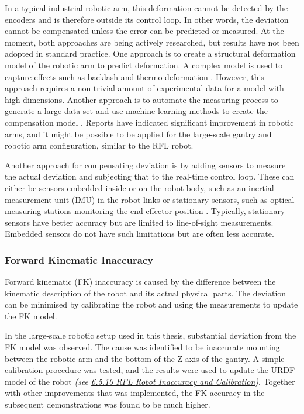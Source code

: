 In a typical industrial robotic arm, this deformation cannot be detected by the encoders and is therefore outside its control loop. In other words, the deviation cannot be compensated unless the error can be predicted or measured. At the moment, both approaches are being actively researched, but results have not been adopted in standard practice. One approach is to create a structural deformation model of the robotic arm to predict deformation. A complex model is used to capture effects such as backlash and thermo deformation \parencite{wuReviewIndustrialRobot2022}. However, this approach requires a non-trivial amount of experimental data for a model with high dimensions. Another approach is to automate the measuring process to generate a large data set and use machine learning methods to create the compensation model \parencite{yeHighaccuracyPredictionCompensation2022}. Reports have indicated significant improvement in robotic arms, and it might be possible to be applied for the large-scale gantry and robotic arm configuration, similar to the RFL robot.

Another approach for compensating deviation is by adding sensors to measure the actual deviation and subjecting that to the real-time control loop. These can either be sensors embedded inside or on the robot body, such as an inertial measurement unit (IMU) in the robot links \parencite{judHEAPAutonomousWalking2021} or stationary sensors, such as optical measuring stations monitoring the end effector position \parencite{stadelmannEndEffectorPoseCorrection2019}. Typically, stationary sensors have better accuracy but are limited to line-of-sight measurements. Embedded sensors do not have such limitations but are often less accurate. 

\subsubsection{Forward Kinematic Inaccuracy}

Forward kinematic (FK) inaccuracy is caused by the difference between the kinematic description of the robot and its actual physical parts. The deviation can be minimised by calibrating the robot \parencite{chen-gangReviewKinematicsCalibration2014, mooringFundamentalsManipulatorCalibration1991} and using the measurements to update the FK model.

In the large-scale robotic setup used in this thesis, substantial deviation from the FK model was observed. The cause was identified to be inaccurate mounting between the robotic arm and the bottom of the Z-axis of the gantry. A simple calibration procedure was tested, and the results were used to update the URDF model of the robot \textit{(see \ul{6.5.10 RFL Robot Inaccuracy and Calibration})}. Together with other improvements that was implemented, the FK accuracy in the subsequent demonstrations was found to be much higher.

